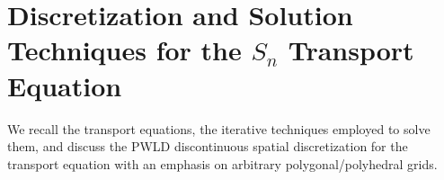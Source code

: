 \section{Discretization and Solution Techniques for the $S_n$ Transport Equation}\label{sec_transport}

We recall the \sn transport equations, the iterative techniques
employed to solve them, and discuss the PWLD discontinuous spatial
discretization for the transport equation with an emphasis on arbitrary
polygonal/polyhedral grids.

